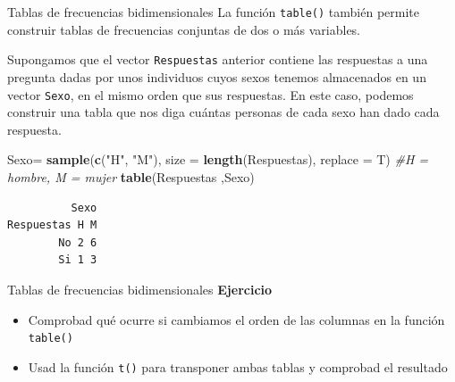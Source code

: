 \documentclass[
  ignorenonframetext,
  aspectratio=169]{beamer}
\newenvironment{Shaded}{\begin{snugshade}}{\end{snugshade}}
\newcommand{\AttributeTok}[1]{\textcolor[rgb]{0.13,0.29,0.53}{#1}}
\newcommand{\CommentTok}[1]{\textcolor[rgb]{0.56,0.35,0.01}{\textit{#1}}}
\newcommand{\FunctionTok}[1]{\textcolor[rgb]{0.13,0.29,0.53}{\textbf{#1}}}
\newcommand{\NormalTok}[1]{#1}
\newcommand{\OtherTok}[1]{\textcolor[rgb]{0.56,0.35,0.01}{#1}}
\newcommand{\StringTok}[1]{\textcolor[rgb]{0.31,0.60,0.02}{#1}}
\providecommand{\tightlist}{%
  \setlength{\itemsep}{0pt}\setlength{\parskip}{0pt}}
\begin{document}
\begin{frame}[fragile]{Tablas de frecuencias bidimensionales}
\label{tablas-de-frecuencias-bidimensionales}
La función \texttt{table()} también permite construir tablas de
frecuencias conjuntas de dos o más variables.

Supongamos que el vector \texttt{Respuestas} anterior contiene las
respuestas a una pregunta dadas por unos individuos cuyos sexos tenemos
almacenados en un vector \texttt{Sexo}, en el mismo orden que sus
respuestas. En este caso, podemos construir una tabla que nos diga
cuántas personas de cada sexo han dado cada respuesta.

\begin{Shaded}
\begin{Highlighting}[]
\NormalTok{Sexo}\OtherTok{=} \FunctionTok{sample}\NormalTok{(}\FunctionTok{c}\NormalTok{(}\StringTok{"H"}\NormalTok{, }\StringTok{"M"}\NormalTok{), }\AttributeTok{size =} \FunctionTok{length}\NormalTok{(Respuestas), }
             \AttributeTok{replace =}\NormalTok{ T) }\CommentTok{\#H = hombre, M = mujer}
\FunctionTok{table}\NormalTok{(Respuestas ,Sexo)}
\end{Highlighting}
\end{Shaded}

\begin{verbatim}
          Sexo
Respuestas H M
        No 2 6
        Si 1 3
\end{verbatim}
\end{frame}

\begin{frame}[fragile]{Tablas de frecuencias bidimensionales}
\label{tablas-de-frecuencias-bidimensionales-1}
\textbf{Ejercicio}

\begin{itemize}
\tightlist
\item
  Comprobad qué ocurre si cambiamos el orden de las columnas en la
  función \texttt{table()}
\item
  Usad la función \texttt{t()} para transponer ambas tablas y comprobad
  el resultado
\end{itemize}
\end{frame}
\end{document}
